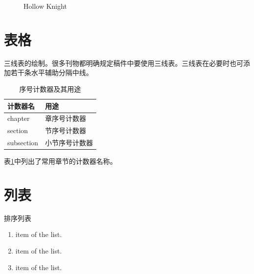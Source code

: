 \begin{figure}[!ht]
{  }
  \hspace{30pt}
\caption{Hollow Knight\label{fig:HK}}
\vspace{-0.3cm}
\end{figure}


\section{表格}
三线表的绘制。很多刊物都明确规定稿件中要使用三线表。三线表在必要时也可添加若干条水平辅助分隔中线。
\begin{table}[!h]
\centering
\caption{序号计数器及其用途\label{tab:2-1}}
\begin{tabular}{@{}ll@{}}
\toprule[1pt]
计数器名   & 用途            \\ \midrule
chapter    & 章序号计数器    \\
section    & 节序号计数器    \\
subsection & 小节序号计数器  \\
\bottomrule[1pt]
\end{tabular}
\end{table}

表\ref{tab:2-1}中列出了常用章节的计数器名称。

\section{列表}
排序列表
\begin{enumerate}
  \item item of the list.
  \item item of the list.
  \item item of the list.
\end{enumerate}


